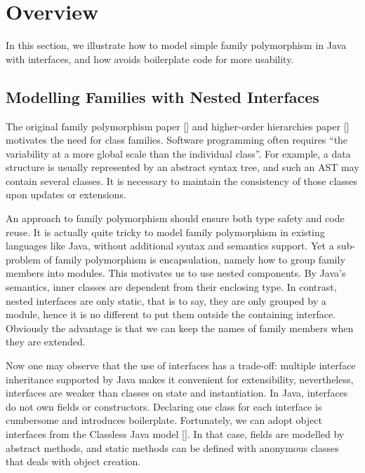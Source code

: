 \section{Overview}\label{sec:overview}

In this section, we illustrate how to model simple family polymorphism in Java with interfaces,
and how \name avoids boilerplate code for more usability.

\subsection{Modelling Families with Nested Interfaces}

The original family polymorphism paper [] and higher-order hierarchies paper [] motivates the need for class families. Software programming
often requires ``the variability at a more global scale than the individual class''. For example, a data
structure is usually represented by an abstract syntax tree, and such an AST may contain several classes.
It is necessary to maintain the consistency of those classes upon updates or extensions. 

An approach to family polymorphism should ensure both type safety and code reuse. It is actually quite tricky to model
family polymorphism in existing languages like Java, without additional syntax and semantics support. Yet a sub-problem of
family polymorphism is encapsulation, namely how to group family members into modules. This motivates us to use nested components.
By Java's semantics, inner classes are dependent from their enclosing type. In contrast, nested interfaces are only static, that is
to say, they are only grouped by a module, hence it is no different to put them outside the containing interface. Obviously
the advantage is that we can keep the names of family members when they are extended. 

Now one may observe that the use of interfaces has a trade-off: multiple interface inheritance supported by Java makes it convenient for extensibility, nevertheless,
interfaces are weaker than classes on state and instantiation. In Java, interfaces do not own fields or constructors.
Declaring one class for each interface is cumbersome and introduces boilerplate.
Fortunately, we can adopt object interfaces from the Classless Java model []. In that case, fields are modelled by abstract methods,
and static methods can be defined with anonymous classes that deals with object creation.

